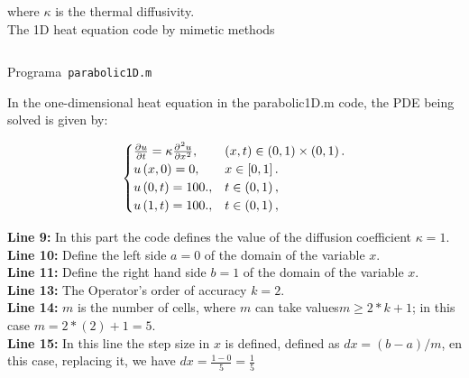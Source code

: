 \documentclass[a4paper,abstract=true]{scrreprt}
\begin{document}
where $\kappa$ is the thermal diffusivity.\\

The 1D heat equation code by mimetic methods


\begin{listing}[ht!]
	\tiny
	\centering
	\inputminted[frame=single,framesep=12pt,linenos,firstline=1,lastline=80,highlightlines={20,29}]{octave}{../examples/octave/parabolic1D.m}
	\caption{Programa~\texttt{parabolic1D.m}}
	\label{code:parabolic1D.m}
\end{listing}


In the one-dimensional heat equation in the parabolic1D.m code, the PDE being solved is given by:


\begin{equation}\label{eq:IBVPheat1d}
	\begin{cases}
		\diffp{u}{t}=
		\kappa\diffp[2]{u}{x},
		                         & \left(x,t\right)\in
		\left(0,1 \right)\times\left(0, 1 \right).     \\
		u\left(x,0\right)= 0,
		                         & x\in
		\left[0,1\right].                              \\
		u\left(0,t\right)= 100., & t\in
		\left(0,1 \right),                             \\
		u\left(1,t\right)= 100.,
		                         & t\in
		\left(0, 1\right),
	\end{cases}
\end{equation}


\textbf{Line 9:} In this part the code defines the value of the diffusion coefficient $\kappa =1$.\\

\textbf{Line 10:} Define the left side $a= 0$ of the domain of the variable $x$.\\

\textbf{Line 11:} Define the right hand side $b= 1$ of the domain of the variable $x$.\\

\textbf{Line 13:} The Operator's order of accuracy $k = 2$.\\

\textbf{Line 14:} $m$ is the number of cells, where $m$ can take values ​​$m \geq 2*k+1$; in this case $m=2*(2)+1=5$.\\

\textbf{Line 15:} In this line the step size in $x$ is defined, defined as $dx=(b-a)/m$, en this case, replacing it, we have $dx =\frac{1-0}{5} =\frac{1}{5}$ \\
\end{document}
